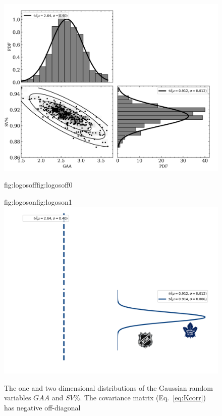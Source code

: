 \begin{figure}
  \centering
  \includegraphics[width=0.9\hsize]{figures/corr_2D_HARTpost_logo_bkgd.png}%
  \hspace{-0.9\hsize}%
  \begin{ocg}{fig:logosoff}{fig:logosoff}{0}%
  \end{ocg}%
  \begin{ocg}{fig:logoson}{fig:logoson}{1}%
    \includegraphics[width=0.9\hsize]{figures/corr_2D_HARTpost_logo_logos.png}%
  \end{ocg}
  \caption[Correlated Gaussian random variables in two dimensions.]
      {The one and two dimensional distributions of the Gaussian random
    variables $GAA$ and $SV$\%.
    The covariance matrix (Eq.~\ref{eq:Kcorr}) has negative off-diagonal
}
\end{figure}
